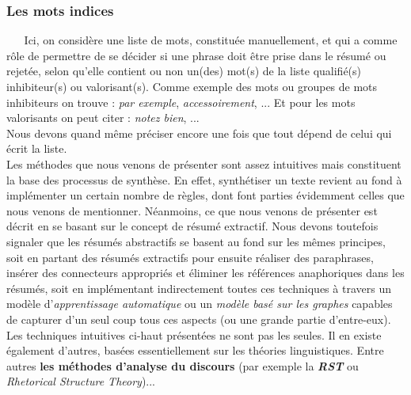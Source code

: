 \subsubsection{Les mots indices}
$ _{} $ $ _{} $ $ _{} $ $ _{} $ $ _{} $Ici, on considère une liste de mots, constituée manuellement, et qui a comme rôle de permettre de se décider si une phrase doit être prise dans le résumé ou rejetée, selon qu'elle contient ou non un(des) mot(s) de la liste qualifié(s) inhibiteur(s) ou valorisant(s). Comme exemple des mots ou groupes de mots inhibiteurs on trouve : \textit{par exemple}, \textit{ac\-ces\-soi\-re\-ment}, ... Et pour les mots valorisants on peut citer : \textit{notez bien}, ...\\
Nous devons quand même préciser encore une fois que tout dépend de celui qui écrit la liste.\\ 

Les méthodes que nous venons de présenter sont assez intuitives mais constituent la base des processus de synthèse. En effet, synthétiser un texte revient au fond à implémenter un certain nombre de règles, dont font parties évidemment celles que nous venons de mentionner. Néanmoins, ce que nous venons de présenter est décrit en se basant sur le concept de résumé extractif. Nous devons toutefois signaler que les résumés abstractifs se basent au fond sur les mêmes principes, soit en partant des résumés extractifs pour ensuite réaliser des paraphrases, insérer des connecteurs appropriés et éliminer les ré\-fé\-ren\-ces anaphoriques dans les résumés, soit en implémentant indirectement toutes ces techniques à travers un modèle d'\textit{apprentissage automatique} ou un \textit{modèle basé sur les graphes} capables de capturer d'un seul coup tous ces aspects (ou une grande partie d'entre-eux). Les techniques intuitives ci-haut présentées ne sont pas les seules. Il en existe également d'autres, basées essentiellement sur les théories linguistiques. Entre autres \textbf{les méthodes d'analyse du discours} (par exemple la \textit{\textbf{RST}} \cite{maaloul:tel-00756111} ou \textit{Rhetorical Structure Theory})...

